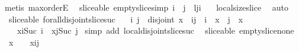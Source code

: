 \begin{isabellebody}
%
\isadelimproof
%
\endisadelimproof
%
\isatagproof
{}\isamarkupfalse%
\ {\isacharparenleft}metis\ max{\isachardot}orderE{\isacharparenright}%
\endisatagproof
{\isafoldproof}%
%
\isadelimproof
\isanewline
%
\endisadelimproof
\isanewline
{}\isamarkupfalse%
\ {\isacharparenleft}\ sliceable{\isacharparenright}\ empty{\isacharunderscore}slice{\isacharbrackleft}simp{\isacharbrackright}{\isacharcolon}\ {\isachardoublequoteopen}i\ {\isasymle}\ j\ {\isasymLongrightarrow}\ {\isacharparenleft}{\isacharhash}{\isacharparenleft}l{\isasymdagger}j{\isachardot}{\isachardot}i{\isacharparenright}{\isacharparenright}\ {\isacharequal}\ {}{\isachardoublequoteclose}\isanewline
%
\isadelimproof
%
\endisadelimproof
%
\isatagproof
{}\isamarkupfalse%
\ local{\isachardot}size{\isacharunderscore}slice\ \isamarkupfalse%
\ auto%
\endisatagproof
{\isafoldproof}%
%
\isadelimproof
\isanewline
%
\endisadelimproof
\isanewline
{}\isamarkupfalse%
\ {\isacharparenleft}\ sliceable{\isacharparenright}\ forall{\isacharunderscore}disjoint{\isacharunderscore}slice{\isacharunderscore}suc{\isacharcolon}\isanewline
\ \ {\isachardoublequoteopen}{\isasymforall}\ i\ j\ {\isachardot}\ {\isacharparenleft}disjoint\ x\ {\isasymand}\ i{\isasymnoteq}j\ {\isasymand}\ i\ {\isacharless}\ {\isacharparenleft}{\isacharhash}x{\isacharparenright}\ {\isasymand}\ j\ {\isacharless}\ {\isacharparenleft}{\isacharhash}x{\isacharparenright}{\isacharparenright}\ {\isasymlongrightarrow}\ \isanewline
\ \ \ \ {\isacharparenleft}x{\isasymdagger}i{\isachardot}{\isachardot}{\isacharparenleft}Suc\ i{\isacharparenright}\ {\isasymnoteq}\ x{\isasymdagger}j{\isachardot}{\isachardot}{\isacharparenleft}Suc\ j{\isacharparenright}{\isacharparenright}{\isachardoublequoteclose}\isanewline
%
\isadelimproof
%
\endisadelimproof
%
\isatagproof
{}\isamarkupfalse%
\ {\isacharparenleft}simp\ add{\isacharcolon}\ local{\isachardot}disjoint{\isacharunderscore}slice{\isacharunderscore}suc{\isacharparenright}%
\endisatagproof
{\isafoldproof}%
%
\isadelimproof
\isanewline
%
\endisadelimproof
\isanewline
{}\isamarkupfalse%
\ {\isacharparenleft}\ sliceable{\isacharparenright}\ empty{\isacharunderscore}slice{\isacharunderscore}none{\isacharcolon}\isanewline
\ \ {\isachardoublequoteopen}{\isacharparenleft}{\isacharhash}x{\isacharparenright}\ {\isacharequal}\ {}\ {\isasymLongrightarrow}\ {\isacharparenleft}{\isacharhash}{\isacharparenleft}x{\isasymdagger}i{\isachardot}{\isachardot}j{\isacharparenright}{\isacharparenright}\ {\isacharequal}\ {}{\isachardoublequoteclose}\isanewline

\end{isabellebody}
